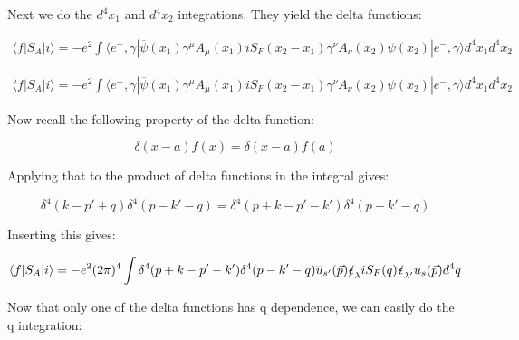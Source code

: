 \documentclass[a4]{article}
\begin{document}
\begin{framed}
            Next we do the $d^{4} x_{1}$ and $d^{4} x_{2}$ integrations. They yield the delta functions:

            \begin{equation}
                \begin{aligned}
                    \langle f | S_{A} | i \rangle = - e^{2} \int \langle e^{-}, \gamma |\overline{\psi} (x_1) \gamma^{\mu} A_{\mu} (x_1) i S_{F} (x_2 - x_1) \gamma^{\nu} A_{\nu} (x_2) \psi (x_2)| e^{-}, \gamma \rangle d^{4} x_{1} d^{4} x_{2}
                \end{aligned}
            \end{equation}

            \begin{equation}
                \begin{aligned}
                    \langle f | S_{A} | i \rangle = - e^{2} \int \langle e^{-}, \gamma |\overline{\psi} (x_1) \gamma^{\mu} A_{\mu} (x_1) i S_{F} (x_2 - x_1) \gamma^{\nu} A_{\nu} (x_2) \psi (x_2)| e^{-}, \gamma \rangle d^{4} x_{1} d^{4} x_{2}
                \end{aligned}
            \end{equation}

            Now recall the following property of the delta function:

            \begin{equation}
                \delta (x - a) f (x) = \delta (x - a) f(a)
            \end{equation}

            Applying that to the product of delta functions in the integral gives:

            \begin{equation}
                \delta^{4} (k - p' + q) \delta^{4} (p - k' - q) = \delta^{4} (p + k - p' - k') \delta^{4} (p - k' - q)
            \end{equation}

            Inserting this gives:

            \begin{equation}
                \langle f | S_{A} | i \rangle = -e^{2} (2 \pi)^4 \int \delta^{4} (p + k - p' - k') \delta^{4} (p - k' - q) \overline{u}_{s'} (\vec{p}) \slashed{\epsilon}_{\lambda} i S_{F} (q) \slashed{\epsilon}_{\lambda'} u_{s} (\vec{p}) d^{4} q
            \end{equation}

            Now that only one of the delta functions has q dependence, we can easily do the q integration:


\end{framed}
\end{document}
